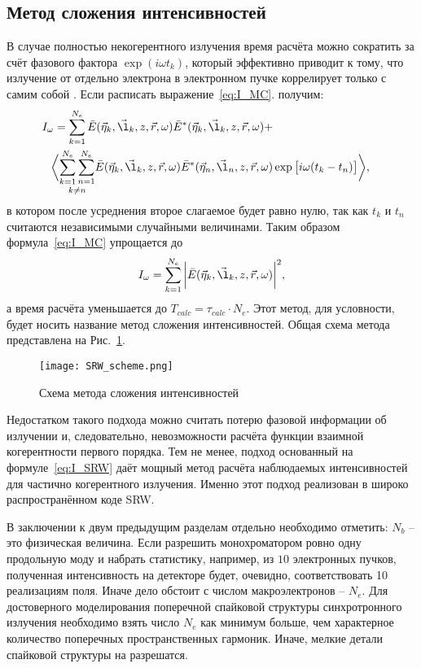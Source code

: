 \subsection{Метод сложения интенсивностей}
В случае полностью некогерентного излучения время расчёта можно сократить за счёт фазового фактора $\exp{(i \omega t_k)}$, который эффективно приводит к тому, что излучение от отдельно электрона в электронном пучке коррелирует только с самим собой \cite{geloni_transverse_2008}. Если расписать выражение~\ref{eq:I_MC}. получим: 
\begin{align}
	I_{\omega} = \sum\limits_{k=1}^{N_e} \bar{E}(\vec{\eta}_k, \vec{\l}_k, z, \vec{r}, \omega)\bar{E}^{*}(\vec{\eta}_k, \vec{\l}_k, z, \vec{r}, \omega) + \cr
	\bigg \langle \underset{k \neq n}{\sum\limits_{k=1}^{N_e} \sum\limits_{n=1}^{N_e}} \bar{E}(\vec{\eta}_k, \vec{\l}_k, z, \vec{r}, \omega)\bar{E}^{*}(\vec{\eta}_n, \vec{\l}_n, z, \vec{r}, \omega) & \exp{\big[i \omega (t_k - t_n)\big]}\bigg \rangle,
	\label{eq:I_SRW_with_explicit_sum} 
\end{align}
в котором после усреднения второе слагаемое будет равно нулю, так как $t_k$ и $t_n$ считаются независимыми случайными величинами. Таким образом формула~\ref{eq:I_MC} упрощается до 
\begin{align}
 	I_{\omega} = \sum\limits_{k=1}^{N_e} \bigg|\bar{E}(\vec{\eta}_k, \vec{\l}_k, z, \vec{r}, \omega)\bigg|^2,
 	\label{eq:I_SRW} 
\end{align}
а время расчёта уменьшается до $T_{calc} = \tau_{calc} \cdot N_e$. Этот метод, для условности, будет носить название метод сложения интенсивностей. Общая схема метода представлена на Рис.~\ref{fig:SRW_scheme}.
\begin{figure}[H] 
	\centering 	\texttt{[image: SRW\_scheme.png]}
	\caption{Схема метода сложения интенсивностей}
	\label{fig:SRW_scheme}
\end{figure}
\noindent  Недостатком такого подхода можно считать потерю фазовой информации об излучении и, следовательно, невозможности расчёта функции взаимной когерентности первого порядка. Тем не менее, подход основанный на формуле~\ref{eq:I_SRW} даёт мощный метод расчёта наблюдаемых интенсивностей для частично когерентного излучения. Именно этот подход реализован в широко распространённом коде SRW.

В заключении к двум предыдущим разделам отдельно необходимо отметить: $N_b$ -- это физическая величина. Если разрешить монохроматором ровно одну продольную моду и набрать статистику, например, из $10$ электронных пучков, полученная интенсивность на детекторе будет, очевидно, соответствовать 10 реализациям поля. Иначе дело обстоит с числом макроэлектронов -- $N_e$. Для достоверного моделирования поперечной спайковой структуры синхротронного излучения необходимо взять число $N_e$ как минимум больше, чем характерное количество поперечных пространственных гармоник. Иначе, мелкие детали спайковой структуры на разрешатся.
  
